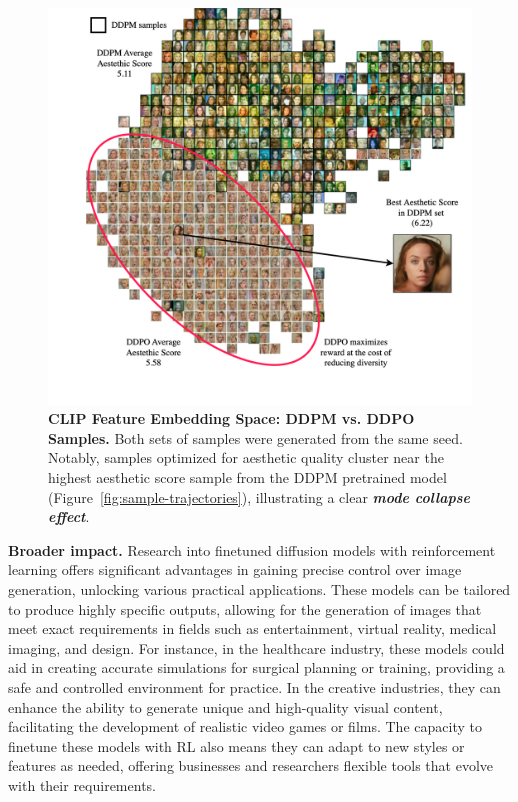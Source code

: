 \begin{figure}[ht]
  \centering
  \includegraphics[scale=0.72]{img/results/emb-space-ddpo-vs-ddpm2.png}
  \vspace{-40pt}  %
    \captionsetup{width=\textwidth} %
    \caption{\textbf{CLIP Feature Embedding Space: DDPM vs. DDPO Samples.} Both sets of samples were generated from the same seed. Notably, samples optimized for aesthetic quality cluster near the highest aesthetic score sample from the DDPM pretrained model (Figure~\ref{fig:sample-trajectories}), illustrating a clear \textit{\textbf{mode collapse effect}}.}
    \label{fig:clip-emb-ddpo-vs-ddpm}
\end{figure}

\noindent\textbf{Broader impact.} Research into finetuned diffusion models with reinforcement learning offers significant advantages in gaining precise control over image generation, unlocking various practical applications. These models can be tailored to produce highly specific outputs, allowing for the generation of images that meet exact requirements in fields such as entertainment, virtual reality, medical imaging, and design. For instance, in the healthcare industry, these models could aid in creating accurate simulations for surgical planning or training, providing a safe and controlled environment for practice. In the creative industries, they can enhance the ability to generate unique and high-quality visual content, facilitating the development of realistic video games or films. The capacity to finetune these models with RL also means they can adapt to new styles or features as needed, offering businesses and researchers flexible tools that evolve with their requirements. \\

